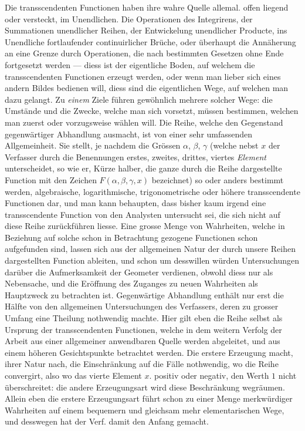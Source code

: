 Die transscendenten Functionen haben ihre wahre Quelle allemal. offen liegend
oder versteckt, im Unendlichen. Die Operationen des Integrirens, der Summationen
unendlicher Reihen, der Entwickelung unendlicher Producte, ins Unendliche
fortlaufender continuirlicher Brüche, oder überhaupt die Annäherung an
eine Grenze durch Operationen, die nach bestimmten Gesetzen ohne Ende fortgesetzt
werden --- diess ist der eigentliche Boden, auf welchem die transscendenten
Functionen erzeugt werden, oder wenn man lieber sich eines andern Bildes
bedienen will, diess sind die eigentlichen Wege, auf welchen man dazu gelangt.
Zu \emph{einem} Ziele führen gewöhnlich mehrere solcher Wege: die Umstände und die
Zwecke, welche man sich vorsetzt, müssen bestimmen, welchen man zuerst oder
vorzugsweise wählen will. Die Reihe, welche den Gegenstand gegenwärtiger Abhandlung
ausmacht, ist von einer sehr umfassenden Allgemeinheit. Sie stellt,
je nachdem die Grössen $\alpha$, $\beta$, $\gamma$ (welche nebst $x$ der Verfasser durch die Benennungen
erstes, zweites, drittes, viertes \emph{Element} unterscheidet, so wie er, Kürze
halber, die ganze durch die Reihe dargestellte Function mit den Zeichen $F(\alpha,\beta,\gamma,x)$
bezeichnet) so oder anders bestimmt werden, algebraische, logarithmische, trigonometrische
oder höhere transscendente Functionen dar, und man kann behaupten,
dass bisher kaum irgend eine transscendente Function von den Analysten untersucht
sei, die sich nicht auf diese Reihe zurückführen liesse. Eine grosse
Menge von Wahrheiten, welche in Beziehung auf solche schon in Betrachtung gezogene
Functionen schon aufgefunden sind, lassen sich aus der allgemeinen Natur
der durch unsere Reihen dargestellten Function ableiten, und schon um desswillen
würden Untersuchungen darüber die Aufmerksamkeit der Geometer verdienen,
obwohl diess nur als Nebensache, und die Eröffnung des Zuganges zu neuen
Wahrheiten als Hauptzweck zu betrachten ist. Gegenwärtige Abhandlung enthält
nur erst die Hälfte von den allgemeinen Untersuchungen des Verfassers, deren
zu grosser Umfang eine Theilung nothwendig machte. Hier gilt eben die
Reihe selbst als Ursprung der transscendenten Functionen, welche in dem weitern
Verfolg der Arbeit aus einer allgemeiner anwendbaren Quelle werden abgeleitet,
und aus einem höheren Gesichtspunkte betrachtet werden. Die erstere
Erzeugung macht, ihrer Natur nach, die Einschränkung auf die Fälle nothwendig,
wo die Reihe convergirt, also wo das vierte Element $x$. positiv oder negativ,
den Werth $1$ nicht überschreitet: die andere Erzeugungsart wird diese Beschränkung wegräumen. Allein eben die erstere Erzeugungsart führt schon zu einer Menge merkwürdiger Wahrheiten auf einem bequemern und gleichsam mehr elementarischen Wege, und desswegen hat der Verf. damit den Anfang gemacht.

